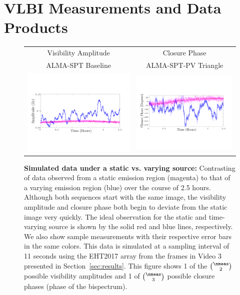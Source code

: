 \section{VLBI Measurements and Data Products}
\label{sec:meas}



\begin{figure}[h!]
	\begin{center}
		\begin{tabular}{  c  c   }
			\large{\textsf{Visibility Amplitude}}   &\large{\textsf{Closure Phase}}      \\ 
			\small{\textsf{ALMA-SPT Baseline}}   &\small{\textsf{ALMA-SPT-PV Triangle}}      \\ 
			\includegraphics[width=.47\linewidth]{figures/compare_var2static/visamplitudes_notitle_editted.pdf} &
			\includegraphics[width=.47\linewidth]{figures/compare_var2static/closurephase_notitle_editted.pdf} 
			\\
		\end{tabular}
		\caption{{\bf Simulated data under a static vs. varying source:} Contrasting of data observed from a static emission region (magenta) to that of a varying emission region (blue) over the course of 2.5 hours. Although both sequences start with the same image, the visibility amplitude and closure phase both begin to deviate from the static image very quickly. The ideal observation for the static and time-varying source is shown by the solid red and blue lines, respectively. We also show sample measurements with their respective error bars in the same colors. This data is simulated at a sampling interval of 11 seconds using the EHT2017 array from the frames in Video 3 presented in Section~\ref{sec:results}. This figure shows 1 of the ${\nmeas \choose 2}$ possible visibility amplitudes and 1 of ${\nmeas \choose 3}$ possible closure phases (phase of the bispectrum). }

\end{center}
\end{figure}
